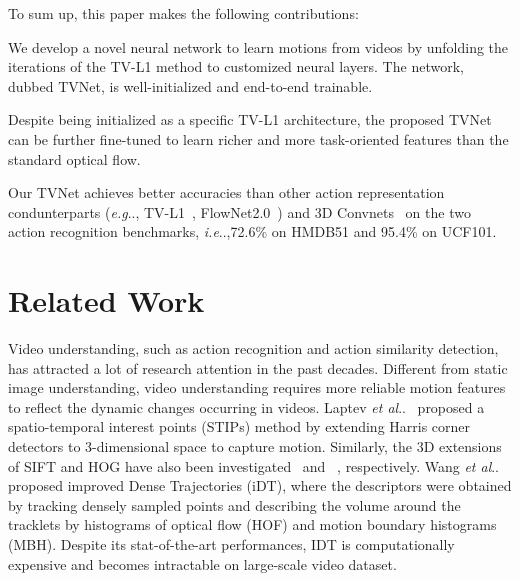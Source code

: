 \documentclass[10pt,twocolumn,letterpaper]{article}
\makeatletter
\DeclareRobustCommand\onedot{\futurelet\@let@token\@onedot}
\def\@onedot{\ifx\@let@token.\else.\null\fi\xspace}
\def\eg{\emph{e.g}\onedot} \def\Eg{\emph{E.g}\onedot}
\def\ie{\emph{i.e}\onedot} \def\Ie{\emph{I.e}\onedot}
\def\etal{\emph{et al}\onedot}
\makeatother
\begin{document}
To sum up, this paper makes the following contributions:
\begin{compactitem}
  \item We develop a novel neural network to learn motions from videos by unfolding the iterations of the TV-L1 method to customized neural layers. The network, dubbed TVNet, is well-initialized and end-to-end trainable.
  \item Despite being initialized as a specific TV-L1 architecture, the proposed TVNet can be further fine-tuned to learn richer and more task-oriented features than the standard optical flow.
  \item Our TVNet achieves better accuracies than other action representation condunterparts (\eg, TV-L1~\cite{zach2007duality}, FlowNet2.0~\cite{ilg2016flownet}) and 3D Convnets~\cite{tran2015learning} on the two action recognition benchmarks, \ie,72.6\% on HMDB51 and 95.4\% on UCF101. \end{compactitem}

\section{Related Work}
\label{Sec:related-work}
Video understanding, such as action recognition and action similarity detection, has attracted a lot of research attention in the past decades.
Different from static image understanding, video understanding requires more reliable motion features to reflect the dynamic changes occurring in videos. Laptev \etal~\cite{laptev2005space} proposed a spatio-temporal interest points (STIPs) method by extending Harris corner detectors to 3-dimensional space to capture motion. Similarly, the 3D extensions of SIFT and HOG have also been investigated~\cite{Mosift} and ~\cite{klaser2008spatio}, respectively. Wang \etal~\cite{wang2013action} proposed improved Dense Trajectories (iDT), where the descriptors were obtained by tracking densely sampled points and describing the volume around the tracklets by histograms of optical flow (HOF) and motion boundary histograms (MBH). Despite its stat-of-the-art performances, IDT is computationally expensive and becomes intractable on large-scale video dataset.
\end{document}
